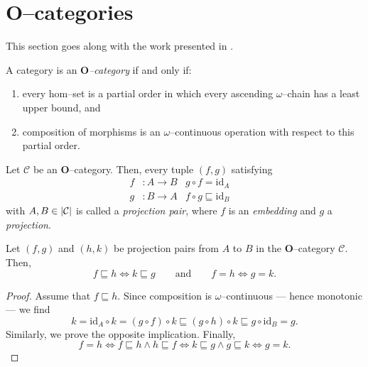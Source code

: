\section{\(\mathbf{O}\)--categories}

This section goes along with the work presented in \cite{smy-plot}.

\begin{dfn}
  A category is an \emph{\(\mathbf{O}\)--category} if and only if:
  \begin{enumerate}
    \item every hom--set is a partial order in which every ascending \(\omega\)--chain has a least upper bound, and
    \item composition of morphisms is an \(\omega\)--continuous operation with respect to this partial order.
  \end{enumerate}
\end{dfn}

\begin{dfn}
  Let \(\mathcal{C}\) be an \(\mathbf{O}\)--category. Then, every tuple \((f,g)\) satisfying
  \begin{align}
    f &\colon A \to B & g \circ f = \mathrm{id}_A \quad  \\
    g &\colon B \to A & f \circ g \sqsubseteq \mathrm{id}_B \quad 
  \end{align}
  with \(A,B \in \lvert \mathcal{C} \rvert\) is called a \emph{projection pair}, where \(f\) is an \emph{embedding} and \(g\) a \emph{projection}.
\end{dfn}

\begin{lem}
  Let \((f,g)\) and \((h,k)\) be projection pairs from \(A\) to \(B\) in the \(\mathbf{O}\)--category \(\mathcal{C}\). Then,
  \begin{equation*}
    f \sqsubseteq h \iff k \sqsubseteq g \qquad \text{and} \qquad
    f = h \iff g = k.
  \end{equation*}
\end{lem}
\begin{proof}
  Assume that \(f \sqsubseteq h\). Since composition is \(\omega\)--continuous --- hence monotonic --- we find
  \begin{equation*}
    k = \mathrm{id}_A \circ k = (g \circ f) \circ k
    \sqsubseteq (g \circ h) \circ k \sqsubseteq g \circ \mathrm{id}_B = g.
  \end{equation*}
  Similarly, we prove the opposite implication. Finally,
  \begin{equation*}
    f = h \iff f \sqsubseteq h \land h \sqsubseteq f
    \iff k \sqsubseteq g \land g \sqsubseteq k \iff g = k.
  \end{equation*}
\end{proof}

